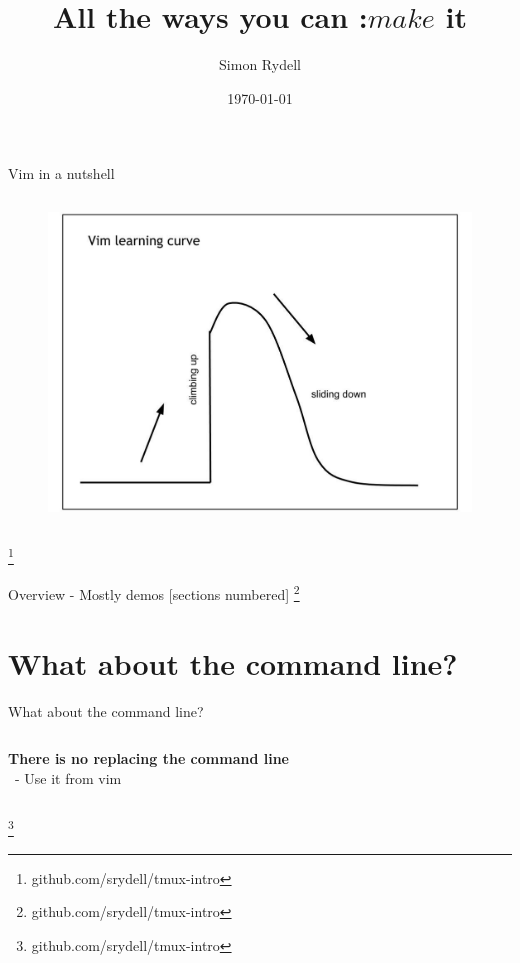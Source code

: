 \documentclass[12pt]{beamer}
\title{All the ways you can :$make$ it}
\date{\today}
\author{Simon Rydell}
\newcommand\blfootnote[1]{%
  \begingroup
  \renewcommand\thefootnote{}\footnote{#1}%
  \addtocounter{footnote}{-1}%
  \endgroup
}
\begin{document}
\begin{frame}
\titlepage
\end{frame}

% 
\begin{frame}{Vim in a nutshell}
    \begin{columns}[c]
        \column{4in}
            \begin{figure}[h!]
                \centering
                \includegraphics[width=.8\textwidth]{../figures/learingCurve.pdf}
            \end{figure}
    \end{columns}
    \blfootnote{github.com/srydell/tmux-intro}
\end{frame}

% 
\begin{frame}{Overview - Mostly demos}
    [sections numbered]
    \tableofcontents[hideallsubsections]
    \blfootnote{github.com/srydell/tmux-intro}
\end{frame}

\section{What about the command line?}

\begin{frame}{What about the command line?}
    \begin{columns}[c]
        \column{4in}
            \Large \textbf{There is no replacing the command line} \\
            \ - Use it from vim
    \end{columns}
    \blfootnote{github.com/srydell/tmux-intro}
\end{frame}
\end{document}
